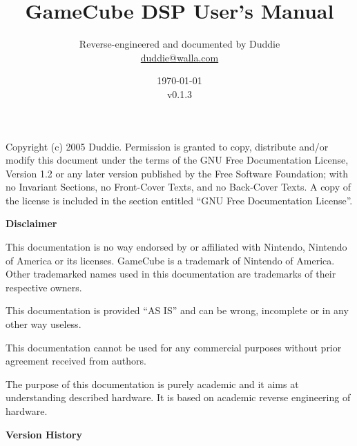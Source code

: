 \documentclass[oneside,english,a4paper,10pt,oneside,openany,final]{memoir}
\title{\textbf{\Huge GameCube DSP User's Manual}}
\author{Reverse-engineered and documented by Duddie \\ \href{mailto:duddie@walla.com}{duddie@walla.com}}
\date{\today\\v0.1.3}
\begin{document}
\maketitle{}

\pagebreak{}
\vspace*{\fill}

Copyright (c) 2005 Duddie. Permission is granted to copy, distribute and/or modify this document under the terms of the GNU Free Documentation License, Version 1.2 or any later version published by the Free Software Foundation; with no Invariant Sections, no Front-Cover Texts, and no Back-Cover Texts. A copy of the license is included in the section entitled ``GNU Free Documentation License''.

\pagebreak{}
\tableofcontents{}
\pagebreak{}

\textbf{\LARGE Disclaimer}
\vspace{5mm}

This documentation is no way endorsed by or affiliated with Nintendo, Nintendo of America or its licenses. GameCube is a trademark of Nintendo of America. Other trademarked names used in this documentation are trademarks of their respective owners.

This documentation is provided ``AS IS'' and can be wrong, incomplete or in any other way useless.

This documentation cannot be used for any commercial purposes without prior agreement received from authors.

The purpose of this documentation is purely academic and it aims at understanding described hardware. It is based on academic reverse engineering of hardware.

\pagebreak{}
\textbf{\LARGE Version History}
\vspace{5mm}
\end{document}
